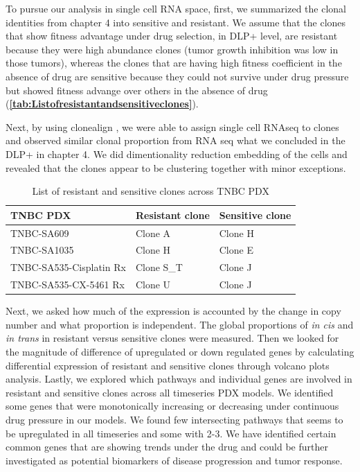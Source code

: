 To pursue our analysis in single cell RNA space, first, we summarized the clonal identities from chapter 4 into sensitive and resistant. We assume that the clones that show fitness advantage under drug selection, in DLP+ level, are resistant because they were high abundance clones (tumor growth inhibition was low in those tumors), whereas the clones that are having high fitness coefficient in the absence of drug are sensitive because they could not survive under drug pressure but showed fitness advange over others in the absence of drug (\textbf{\autoref{tab:Listofresistantandsensitiveclones}}).
 
Next, by using clonealign \cite{campbell2019clonealign}, we were able to assign single cell RNAseq to clones and observed similar clonal proportion from RNA seq what we concluded in the DLP+ in chapter 4. 
We did dimentionality reduction embedding of the cells and revealed that the clones appear to be clustering together with minor exceptions. 

 \begin{table}[htbp]
   
   \centering
   \caption{List of resistant and sensitive clones across TNBC PDX}
     \begin{tabular}{|l|l|l|}
      \hline
     TNBC PDX & Resistant clone & Sensitive clone \\
     \hline
     TNBC-SA609  & Clone A & Clone H \\
     TNBC-SA1035 & Clone H & Clone E \\
     TNBC-SA535-Cisplatin Rx & Clone S\_T & Clone J \\
     TNBC-SA535-CX-5461 Rx & Clone U & Clone J \\    \hline
     \end{tabular}%
   \label{tab:Listofresistantandsensitiveclones}%
   
  
 \end{table}%
Next, we asked how much of the expression is accounted by the change in copy number and what proportion is independent. The global proportions of \textit{in cis} and \textit{in trans} in resistant versus sensitive clones were measured. Then we looked for the magnitude of difference of upregulated or down regulated genes by calculating differential expression of resistant and sensitive clones through volcano plots analysis. Lastly, we explored which pathways and individual genes are involved in resistant and sensitive clones across all timeseries PDX models. We identified some genes that were monotonically increasing or decreasing under continuous drug pressure in our models. We found few intersecting pathways that seems to be upregulated in all timeseries and some with 2-3. We have identified certain common genes that are showing trends under the drug and could be further investigated as potential biomarkers of disease progression and tumor response.

